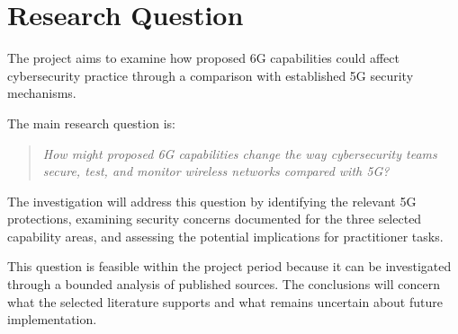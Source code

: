 \chapter{Research Question}
\label{ch:research-question}

The project aims to examine how proposed 6G capabilities
could affect cybersecurity practice through a comparison
with established 5G security mechanisms.

The main research question is:

\begin{quote}
\emph{How might proposed 6G capabilities change the way
cybersecurity teams secure, test, and monitor wireless
networks compared with 5G?}
\end{quote}

The investigation will address this question by identifying
the relevant 5G protections, examining security concerns
documented for the three selected capability areas,
and assessing the potential implications for practitioner
tasks.

This question is feasible within the project period
because it can be investigated through a bounded
analysis of published sources. The conclusions will
concern what the selected literature supports and
what remains uncertain about future implementation.